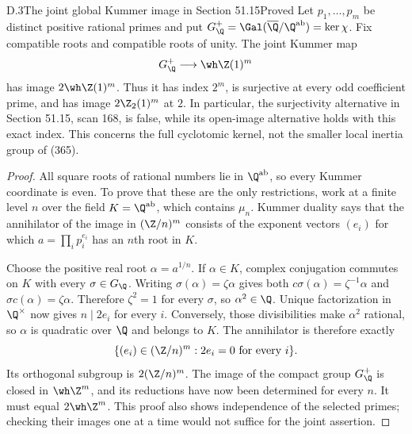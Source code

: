 \begin{statement}{D.3}{The joint global Kummer image in Section 51.15}{Proved}
Let $p_1,\ldots,p_m$ be distinct positive rational primes and put
$G_{\Q}^{+}=\Gal(\overline\Q/\Q^{\mathrm{ab}})=\ker\chi$.
Fix compatible roots and compatible roots of unity. The joint Kummer map
\[
G_{\Q}^{+}\longrightarrow\wh\Z(1)^m
\]
has image $2\wh\Z(1)^m$. Thus it has index $2^m$, is surjective at every
odd coefficient prime, and has image $2\Z_2(1)^m$ at $2$. In particular,
the surjectivity alternative in Section 51.15, scan 168, is false, while
its open-image alternative holds with this exact index. This concerns
the full cyclotomic kernel, not the smaller local inertia group of (365).
\end{statement}
\begin{proof}
All square roots of rational numbers lie in $\Q^{\mathrm{ab}}$, so every
Kummer coordinate is even. To prove that these are the only restrictions,
work at a finite level $n$ over the field $K=\Q^{\mathrm{ab}}$, which
contains $\mu_n$. Kummer duality says that the annihilator of the image
in $(\Z/n)^m$ consists of the exponent vectors $(e_i)$ for which
$a=\prod_i p_i^{e_i}$ has an $n$th root in $K$.

Choose the positive real root $\alpha=a^{1/n}$. If $\alpha\in K$, complex
conjugation commutes on $K$ with every $\sigma\in G_\Q$. Writing
$\sigma(\alpha)=\zeta\alpha$ gives both
$c\sigma(\alpha)=\zeta^{-1}\alpha$ and
$\sigma c(\alpha)=\zeta\alpha$. Therefore $\zeta^2=1$ for every
$\sigma$, so $\alpha^2\in\Q$. Unique factorization in $\Q^\times$ now
gives $n\mid2e_i$ for every $i$. Conversely, those divisibilities make
$\alpha^2$ rational, so $\alpha$ is quadratic over $\Q$ and belongs to
$K$. The annihilator is therefore exactly
\[
\{(e_i)\in(\Z/n)^m:2e_i=0\ \text{for every }i\}.
\]
Its orthogonal subgroup is $2(\Z/n)^m$. The image of the compact group
$G_\Q^+$ is closed in $\wh\Z^m$, and its reductions have now been
determined for every $n$. It must equal $2\wh\Z^m$. This proof also
shows independence of the selected primes; checking their images one at
a time would not suffice for the joint assertion.
\end{proof}


